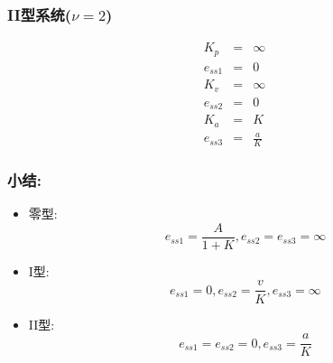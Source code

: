 \documentclass{article}
\begin{document}
\begin{frame}
\frametitle{II型系统($\nu=2$)}
\label{sec-3-2-8}

\begin{eqnarray*}
K_p & = & \infty\\
e_{ss1} &=& 0 \\
K_v & = & \infty \\
e_{ss2} &=& 0 \\
K_a &=& K \\
e_{ss3} &=& \frac{a}{K}
\end{eqnarray*}
\end{frame}
\begin{frame}
\frametitle{小结:}
\label{sec-3-2-9}

\begin{itemize}
\item <2->零型:
      \[e_{ss1}=\frac{A}{1+K},e_{ss2}=e_{ss3}=\infty\]
\item <3->I型:
      \[e_{ss1}=0,e_{ss2}=\frac{v}{K},e_{ss3}=\infty\]
\item <4->II型:
      \[e_{ss1}=e_{ss2}=0,e_{ss3}=\frac{a}{K}\]
\end{itemize}
\end{frame}
\end{document}
